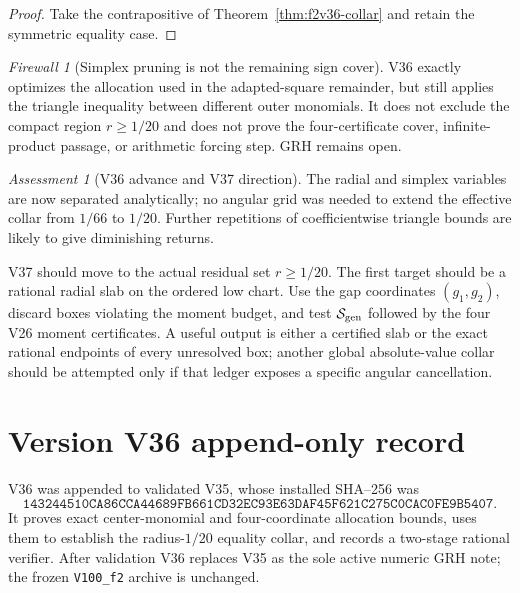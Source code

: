 \documentclass[11pt]{article}
\theoremstyle{definition}
\theoremstyle{remark}
\newtheorem{assessment}[theorem]{Assessment}
\newtheorem{firewall}[theorem]{Firewall}
\begin{document}
\begin{proof}
Take the contrapositive of Theorem~\ref{thm:f2v36-collar} and retain the
symmetric equality case.
\end{proof}

\begin{firewall}[Simplex pruning is not the remaining sign cover]
\label{fire:f2v36}
V36 exactly optimizes the allocation used in the adapted-square remainder,
but still applies the triangle inequality between different outer
monomials.  It does not exclude the compact region \(r\geq1/20\) and does
not prove the four-certificate cover, infinite-product passage, or
arithmetic forcing step.  GRH remains open.
\end{firewall}

\begin{assessment}[V36 advance and V37 direction]
\label{ass:f2v36}
The radial and simplex variables are now separated analytically; no angular
grid was needed to extend the effective collar from \(1/66\) to \(1/20\).
Further repetitions of coefficientwise triangle bounds are likely to give
diminishing returns.

V37 should move to the actual residual set \(r\geq1/20\).  The first
target should be a rational radial slab on the ordered low chart.  Use the
gap coordinates \((g_1,g_2)\), discard boxes violating the moment budget,
and test \(\mathcal S_{\rm gen}\) followed by the four V26 moment
certificates.  A useful output is either a certified slab or the exact
rational endpoints of every unresolved box; another global absolute-value
collar should be attempted only if that ledger exposes a specific angular
cancellation.
\end{assessment}

\section*{Version V36 append-only record}

V36 was appended to validated V35, whose installed SHA--256 was
\[
 \texttt{143244510CA86CCA44689FB661CD32EC93E63DAF45F621C275C0CAC0FE9B5407}.
\tag{N36.18}
\]
It proves exact center-monomial and four-coordinate allocation bounds,
uses them to establish the radius-\(1/20\) equality collar, and records a
two-stage rational verifier.  After validation V36 replaces V35 as the
sole active numeric GRH note; the frozen \texttt{V100\_f2} archive is
unchanged.
\end{document}
